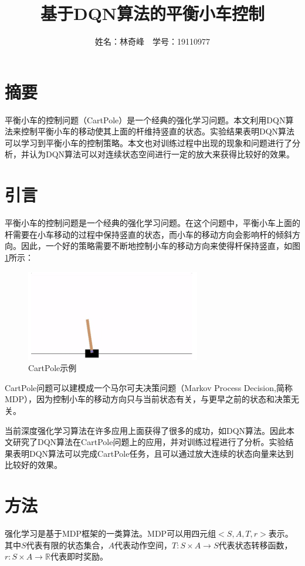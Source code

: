 \documentclass{article}
\begin{document}
    \title{基于DQN算法的平衡小车控制}
    \author{姓名：林奇峰$\quad$学号：19110977}
    \date{}
    \maketitle

    \section{摘要}
        平衡小车的控制问题（CartPole）是一个经典的强化学习问题。本文利用DQN算法来控制平衡小车的移动使其上面的杆维持竖直的状态。实验结果表明DQN算法可以学习到平衡小车的控制策略。本文也对训练过程中出现的现象和问题进行了分析，并认为DQN算法可以对连续状态空间进行一定的放大来获得比较好的效果。
    \section{引言}
        平衡小车的控制问题是一个经典的强化学习问题。在这个问题中，平衡小车上面的杆需要在小车移动的过程中保持竖直的状态，而小车的移动方向会影响杆的倾斜方向。因此，一个好的策略需要不断地控制小车的移动方向来使得杆保持竖直，如图\ref{fig:cartpole}所示：
        \begin{figure}[h]
            \centering
            \includegraphics[width=3.0in]{cartpole.png}
            \caption{CartPole示例}
            \label{fig:cartpole}
        \end{figure}

        CartPole问题可以建模成一个马尔可夫决策问题（Markov Process Decision,简称MDP），因为控制小车的移动方向只与当前状态有关，与更早之前的状态和决策无关。

        当前深度强化学习算法在许多应用上面获得了很多的成功，如DQN算法。因此本文研究了DQN算法在CartPole问题上的应用，并对训练过程进行了分析。实验结果表明DQN算法可以完成CartPole任务，且可以通过放大连续的状态向量来达到比较好的效果。
    \section{方法}
        强化学习是基于MDP框架的一类算法。MDP可以用四元组$<S,A,T,r>$表示。其中$S$代表有限的状态集合，$A$代表动作空间，$T:S\times A\rightarrow S$代表状态转移函数，$r:S\times A\rightarrow\mathbb{R}$代表即时奖励。
\end{document}
